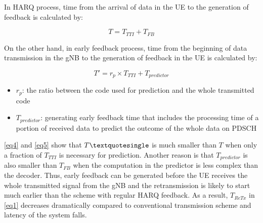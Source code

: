 \documentclass[conference]{IEEEtran}
\begin{document}
In HARQ process, time from the arrival of data in the UE to the generation of feedback is calculated by:

\begin{equation}
T = T_{TTI} + T_{FB}\label{eq4}
\end{equation}

On the other hand, in early feedback process, time from the beginning of data transmission in the gNB to the generation of feedback in the UE is calculated by:

\begin{equation}
T' = r_{p}\times T_{TTI} + T_{predictor}\label{eq5}
\end{equation}

\begin{itemize}
    \item $r_{p}$: the ratio between the code used for prediction and the whole transmitted code
    \item $T_{predictor}$: generating early feedback time that includes the processing time of a portion of received data to predict the outcome of the whole data on PDSCH
\end{itemize}

\eqref{eq4} and \eqref{eq5} show that $T\textquotesingle$ is much smaller than $T$ when only a fraction of $T_{TTI}$ is necessary for prediction. Another reason is that $T_{predictor}$ is also smaller than $T_{FB}$ when the computation in the predictor is less complex than the decoder. Thus, early feedback can be generated before the UE receives the whole transmitted signal from the gNB and the retransmission is likely to start much earlier than the scheme with regular HARQ feedback. As a result, $T_{ReTx}$ in \eqref{eq1} decreases dramatically compared to conventional transmission scheme and latency of the system falls. 
\end{document}
